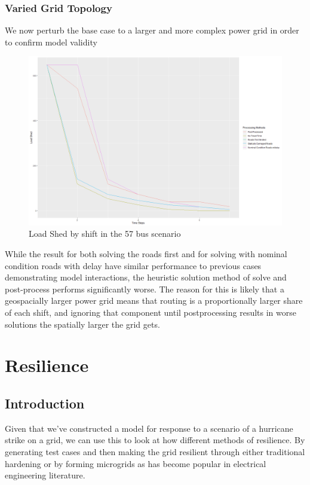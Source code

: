 \documentclass{article}
\begin{document}
	\subsubsection{Varied Grid Topology}
	We now perturb the base case to a larger and more complex power grid in order to confirm model validity 
	\begin{figure}[H]
		\centering
		\includegraphics[width=.9\linewidth]{Rplot57.png}
		\caption{Load Shed by shift in the 57 bus scenario}
		\label{fig:sub2}
		
		
	\end{figure}
	
	While the result for both solving the roads first and for solving with nominal condition roads with delay have similar performance to previous cases demonstrating model interactions, the heuristic solution method of solve and post-process performs significantly worse. The reason for this is likely that a geospacially larger power grid means that routing is a proportionally larger share of each shift, and ignoring that component until postprocessing results in worse solutions the spatially larger the grid gets.
	\section{Resilience}
	\subsection{Introduction}
	Given that we've constructed a model for response to a scenario of a hurricane strike on a grid, we can use this to look at how different methods of resilience. By generating test cases and then making the grid resilient through either traditional hardening or by forming microgrids as has become popular in electrical engineering literature. 
	
\end{document}

